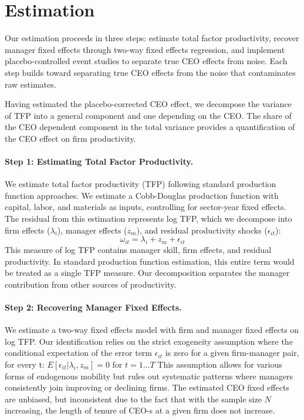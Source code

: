 \documentclass[11pt,a4paper]{article}
\begin{document}
\section{Estimation}\label{sec:est}

Our estimation proceeds in three steps: estimate total factor productivity, recover manager fixed effects through two-way fixed effects regression, and implement placebo-controlled event studies to separate true CEO effects from noise. Each step builds toward separating true CEO effects from the noise that contaminates raw estimates.

Having estimated the placebo-corrected CEO effect, we decompose the variance of TFP into a general component and one depending on the CEO. The share of the CEO dependent component in the total variance provides a quantification of the CEO effect on firm productivity.

\paragraph{Step 1: Estimating Total Factor Productivity.} We estimate total factor productivity (TFP) following standard production function approaches. We estimate a Cobb-Douglas production function with capital, labor, and materials as inputs, controlling for sector-year fixed effects. The residual from this estimation represents log TFP, which we decompose into firm effects ($\lambda_i$), manager effects ($z_m$), and residual productivity shocks ($\epsilon_{it}$):
\begin{equation}
\omega_{it} = \lambda_i + z_m + \epsilon_{it}
\end{equation}
This measure of log TFP contains manager skill, firm effects, and residual productivity. In standard production function estimation, this entire term would be treated as a single TFP measure. Our decomposition separates the manager contribution from other sources of productivity.

\paragraph{Step 2: Recovering Manager Fixed Effects.}

We estimate a two-way fixed effects model with firm and manager fixed effects on log TFP. Our identification relies on the strict exogeneity assumption where the conditional expectation of the error term $\epsilon_{it}$ is zero for a given firm-manager pair, for every t: $E[\epsilon_{it}|\lambda_i, z_m]=0$ for $t=1...T$ This assumption allows for various forms of endogenous mobility but rules out systematic patterns where managers consistently join improving or declining firms. The estimated CEO fixed effects are unbiased, but inconsistent due to the fact that with the sample size $N$ increasing, the length of tenure of CEO-s at a given firm does not increase.
\end{document}
